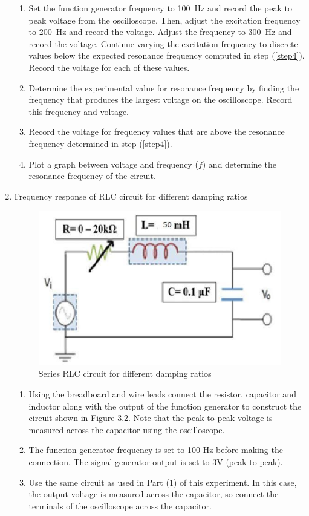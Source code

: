 \documentclass[9pt]{scrreprt}
\begin{document}
\begin{enumerate}
\begin{enumerate}[label=\roman*]
\item Set the function generator frequency to 100~Hz and record the peak to peak voltage from the oscilloscope. Then, adjust the excitation frequency to 200~Hz and record the voltage. Adjust the frequency to 300~Hz and record the voltage. Continue varying the excitation frequency to discrete values below the expected resonance frequency computed in step (\ref{step4}). Record the voltage for each of these values.
\item Determine the experimental value for resonance frequency by finding the frequency that produces the largest voltage on the oscilloscope. Record this frequency and voltage.
\item Record the voltage for frequency values that are above the resonance frequency determined in step (\ref{step4}).
\item Plot a graph between voltage and frequency ($f$) and determine the resonance frequency of the circuit.
\end{enumerate}
\item Frequency response of RLC circuit for different damping ratios
\begin{figure}[H]
	\centering
	\includegraphics[width=0.4\linewidth]{logos/LCR_Damping.PNG}
	\caption{Series RLC circuit for different damping ratios}
	\label{fig:LCR_circuit_damping}
\end{figure}
\begin{enumerate}[label=\roman*]
\item Using the breadboard and wire leads connect the resistor, capacitor and inductor along with the output of the function generator to construct the circuit shown in Figure 3.2. Note that the peak to peak voltage is measured across the capacitor using the
oscilloscope.
\item The function generator frequency is set to 100 Hz before making the connection. The signal generator output is set to 3V (peak to peak).
\item Use the same circuit as used in Part (1) of this experiment. In this case, the output voltage is measured across the capacitor, so connect the terminals of the oscilloscope across the capacitor.

\end{enumerate}
\end{enumerate}
\end{document}
